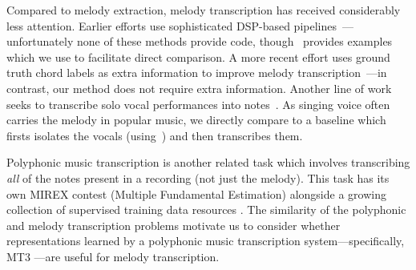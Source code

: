 Compared to melody extraction, melody transcription has received considerably less attention. 
Earlier efforts use sophisticated DSP-based pipelines~\cite{paiva2004auditory,paiva2005detection,ryynanen2008automatic,weil2009automatic}---unfortunately none of these methods provide code, though~\cite{ryynanen2008automatic} provides examples which we use to facilitate direct comparison. 
A more recent effort uses ground truth chord labels as extra information to improve melody transcription~\cite{laaksonen2014automatic}---in contrast, our method does not require extra information. 
Another line of work seeks to transcribe solo vocal performances into notes~\cite{mauch2015computer,nishikimi2020bayesian,nishikimi2021audio}. 
As singing voice often carries the melody in popular music, we directly compare to a baseline which firsts isolates the vocals (using~\cite{hennequin2020spleeter}) and then transcribes them.

Polyphonic music transcription is another related task which involves transcribing \emph{all} of the notes present in a recording (not just the melody).
This task has its own MIREX contest (Multiple Fundamental \fnot{} Estimation) alongside a growing collection of supervised training data resources \cite{benetos2013automatic,thickstun2017learning,hawthorne2019enabling,manilow2019cutting}. 
The similarity of the polyphonic and melody transcription problems
motivate us to consider whether representations learned by a polyphonic music transcription system---specifically, MT3 \cite{gardner2021mt3}---are useful for melody transcription.